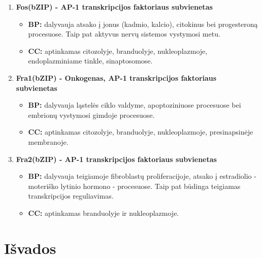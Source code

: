 \documentclass[12pt]{article}
\begin{document}
\begin{enumerate}
    \item \textbf{Fos(bZIP)\cite{FOS} - AP-1 transkripcijos
                  faktoriaus subvienetas}
        \begin{itemize}
            \item \textbf{BP:} dalyvauja atsako į jonus (kadmio,
            kalcio), citokinus bei progesteroną procesuose. Taip
            pat aktyvus nervų sistemos vystymosi metu.
            \item \textbf{CC:} aptinkamas citozolyje, branduolyje,
            nukleoplazmoje, endoplazminiame tinkle, sinaptosomose.
        \end{itemize}

    \item \textbf{Fra1(bZIP)\cite{FRA1} - Onkogenas, AP-1 transkripcijos
                  faktoriaus subvienetas}
        \begin{itemize}
            \item \textbf{BP:} dalyvauja ląstelės ciklo valdyme,
            apoptoziniuose procesuose bei embrionų vystymosi
            gimdoje procesuose.
            \item \textbf{CC:} aptinkamas citozolyje, branduolyje,
            nukleoplazmoje, presinapsinėje membranoje.
        \end{itemize}

    \item \textbf{Fra2(bZIP)\cite{FRA2} - AP-1 transkripcijos
                  faktoriaus subvienetas}
        \begin{itemize}
            \item \textbf{BP:} dalyvauja teigiamoje fibroblastų
            proliferacijoje, atsako į estradiolio - moteriško
            lytinio hormono - procesuose. Taip pat būdinga
            teigiamas transkripcijos reguliavimas.
            \item \textbf{CC:} aptinkamas branduolyje ir
            nukleoplazmoje.
        \end{itemize}
\end{enumerate}

\newpage


\section{Išvados}

\newpage

\end{document}
